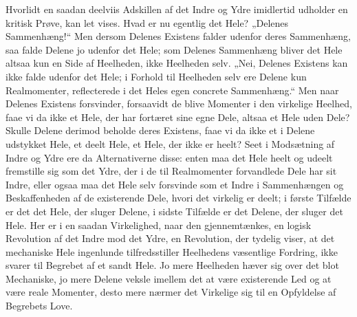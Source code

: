 \documentclass[12pt,a4paper]{book}
\begin{document}
Hvorlidt en saadan deelviis Adskillen af det Indre og Ydre imidlertid
udholder en kritisk Prøve, kan let vises. Hvad er nu egentlig det Hele?
„Delenes Sammenhæng!“ Men dersom Delenes Existens falder udenfor deres
Sammenhæng, saa falde Delene jo udenfor det Hele; som Delenes
Sammenhæng bliver det Hele altsaa kun en Side af Heelheden, ikke
Heelheden selv. „Nei, Delenes Existens kan ikke
falde udenfor det Hele; i Forhold til Heelheden selv ere Delene kun
Realmomenter, reflecterede i det Heles egen concrete Sammenhæng.“ Men
naar Delenes Existens forsvinder, forsaavidt de blive Momenter i den
virkelige Heelhed, faae vi da ikke et Hele, der har fortæret sine egne
Dele, altsaa et Hele uden Dele? Skulle Delene derimod beholde deres
Existens, faae vi da ikke et i Delene udstykket Hele, et deelt Hele, et
Hele, der ikke er heelt? Seet i Modsætning af Indre og Ydre ere da
Alternativerne disse: enten maa det Hele heelt og udeelt fremstille sig
som det Ydre, der i de til Realmomenter forvandlede Dele har sit Indre,
eller ogsaa maa det Hele selv forsvinde som et Indre i Sammenhængen og
Beskaffenheden af de existerende Dele, hvori det virkelig er deelt; i
første Tilfælde er det det Hele, der sluger Delene, i sidste Tilfælde
er det Delene, der sluger det Hele. Her er i en saadan Virkelighed, naar
den gjennemtænkes, en logisk Revolution af det Indre mod det Ydre, en
Revolution, der tydelig viser, at det mechaniske Hele ingenlunde
tilfredsstiller Heelhedens væsentlige Fordring, ikke svarer til
Begrebet af et sandt Hele. Jo mere Heelheden hæver sig over det blot
Mechaniske, jo mere Delene veksle imellem det at være existerende Led og
at være reale Momenter, desto mere nærmer det Virkelige sig til en
Opfyldelse af Begrebets Love.
\end{document}
